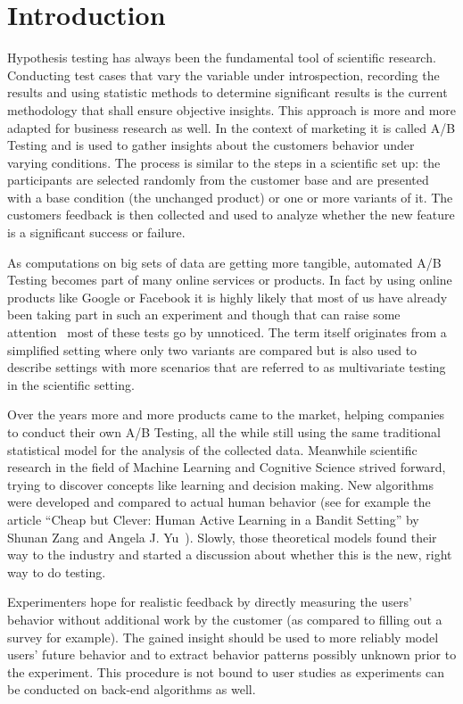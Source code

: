 \documentclass[main.tex]{subfiles}
\begin{document}
\chapter{Introduction}
Hypothesis testing has always been the fundamental tool of scientific research. Conducting test cases that vary the variable under introspection, recording the results and using statistic methods to determine significant results is the current methodology that shall ensure objective insights. This approach is more and more adapted for business research as well. In the context of marketing it is called A/B Testing and is used to gather insights about the customers behavior under varying conditions. The process is similar to the steps in a scientific set up: the participants are selected randomly from the customer base and are presented with a base condition (the unchanged product) or one or more variants of it. The customers feedback is then collected and used to analyze whether the new feature is a significant success or failure.

As computations on big sets of data are getting more tangible, automated A/B Testing becomes part of many online services or products. In fact by using online products like Google or Facebook it is highly likely that most of us have already been taking part in such an experiment and though that can raise some attention~\cite{arthur2014facebook} most of these tests go by unnoticed. The term itself originates from a simplified setting where only two variants are compared but is also used to describe settings with more scenarios that are referred to as multivariate testing in the scientific setting. 

Over the years more and more products came to the market, helping companies to conduct their own A/B Testing, all the while still using the same traditional statistical model for the analysis of the collected data. Meanwhile scientific research in the field of Machine Learning and Cognitive Science strived forward, trying to discover concepts like learning and decision making. New algorithms were developed and compared to actual human behavior (see for example the article ``Cheap but Clever: Human Active Learning in a Bandit Setting'' by Shunan Zang and Angela J. Yu~\cite{zhang2013cheap}). Slowly, those theoretical models found their way to the industry and started a discussion about whether this is the new, right way to do testing.

Experimenters hope for realistic feedback by directly measuring the users' behavior without additional work by the customer (as compared to filling out a survey for example). The gained insight should be used to more reliably model users' future behavior and to extract behavior patterns possibly unknown prior to the experiment. This procedure is not bound to user studies as experiments can be conducted on back-end algorithms as well.
\end{document}
